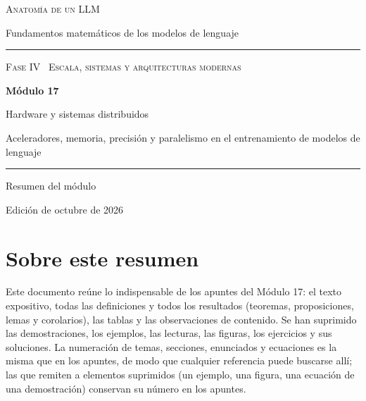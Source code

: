 \documentclass[11pt,a4paper,twoside,openany]{book}
\begin{document}
\frontmatter
\begin{titlepage}
\centering
\vspace*{2.5cm}
{\large\scshape Anatomía de un LLM}\par
\vspace{0.4cm}
{\normalsize Fundamentos matemáticos de los modelos de lenguaje}\par
\vspace{2.2cm}
\rule{\textwidth}{0.8pt}\par\vspace{0.5cm}
{\small\scshape Fase IV \textperiodcentered\ Escala, sistemas y arquitecturas modernas}\par\vspace{0.3cm}
{\Huge\bfseries Módulo 17\par}\vspace{0.3cm}
{\LARGE Hardware y sistemas distribuidos\par}
\vspace{0.2cm}
{\large Aceleradores, memoria, precisión y paralelismo en el entrenamiento de modelos de lenguaje\par}
\vspace{0.5cm}\rule{\textwidth}{0.4pt}\par
\vspace{1.6cm}
{\large Resumen del módulo}\par
\vfill
{\small Edición de octubre de 2026}\par
\end{titlepage}

\chapter*{Sobre este resumen}

Este documento reúne lo indispensable de los apuntes del Módulo 17: el texto expositivo, todas las definiciones y todos los resultados (teoremas, proposiciones, lemas y corolarios), las tablas y las observaciones de contenido. Se han suprimido las demostraciones, los ejemplos, las lecturas, las figuras, los ejercicios y sus soluciones. La numeración de temas, secciones, enunciados y ecuaciones es la misma que en los apuntes, de modo que cualquier referencia puede buscarse allí; las que remiten a elementos suprimidos (un ejemplo, una figura, una ecuación de una demostración) conservan su número en los apuntes.
\end{document}
